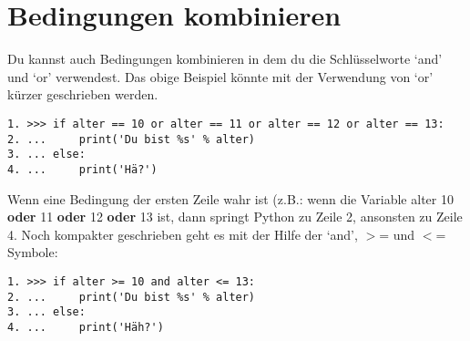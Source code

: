 \section{Bedingungen kombinieren}
Du kannst auch Bedingungen kombinieren in dem du die Schlüsselworte `and' und `or' verwendest. Das obige Beispiel könnte mit der Verwendung von `or' kürzer geschrieben werden.

\begin{Verbatim}[frame=single]
1. >>> if alter == 10 or alter == 11 or alter == 12 or alter == 13:
2. ...     print('Du bist %s' % alter)
3. ... else:
4. ...     print('Hä?')
\end{Verbatim}

Wenn eine Bedingung der ersten Zeile wahr ist (z.B.: wenn die Variable alter 10 \textbf{oder} 11 \textbf{oder} 12 \textbf{oder} 13 ist, dann springt Python zu Zeile 2, ansonsten zu Zeile 4. Noch kompakter geschrieben geht es mit der Hilfe der `and', $>$= und $<$= Symbole:

\begin{Verbatim}[frame=single]
1. >>> if alter >= 10 and alter <= 13:
2. ...     print('Du bist %s' % alter)
3. ... else:
4. ...     print('Häh?')
\end{Verbatim}

